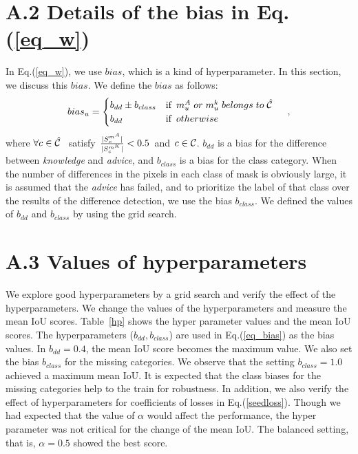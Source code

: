 \documentclass[10pt,twocolumn,letterpaper]{article}
\begin{document}
\section*{A.2 Details of the bias in Eq.(\ref{eq_w})}
In Eq.(\ref{eq_w}), we use $bias$, which is a kind of hyperparameter.
In this section, we discuss this $bias$.
We define the $bias$ as follows:
\footnotesize
\begin{equation}
bias_{u} = 
\begin{cases}
b_{dd} \pm b_{class} & {\rm if}\hspace{1.5mm} m^{A}_{u}\hspace{1.0mm}or\hspace{1.0mm} m^{k}_{u}\hspace{1.0mm}belongs\hspace{1.0mm}to\hspace{1.0mm}\hat{{\cal C}}\hspace{1.0mm}\\
b_{dd} & {\rm if}\hspace{1.5mm}otherwise\\ 
\end{cases}~~~,
\label{eq_bias}
\end{equation}
\normalsize
where $\forall c \in \hat{{\cal C}}\hspace{1.5mm}$ satisfy$\hspace{1.5mm}\frac{|S^{m^{A}}_{c}|}{|S^{m^{K}}_{c}|}<0.5 \hspace{1.5mm}$and$\hspace{1.5mm}c\in {\cal C}$.
$b_{dd}$ is a bias for the difference between {\it knowledge} and {\it advice}, and $ b_{class} $ is a bias for the class category.
When the number of differences in the pixels in each class of mask is obviously large, it is assumed that the {\it advice} has failed, and to prioritize the label of that class over the results of the difference detection, we use the bias $b_{class}$.
We defined the values of $ b_ {dd}$ and $b_{class} $ by using the grid search.


\section*{A.3 Values of hyperparameters}

We explore good hyperparameters by a grid search and verify the effect of the hyperparameters.
We change the values of the hyperparameters and measure the mean IoU scores.
Table~\ref{hp} shows the hyper parameter values and the mean IoU scores.
The hyperparameters ($b_{dd}, b_{class}$) are used in Eq.(\ref{eq_bias}) as the bias values.
In $b_{dd}=0.4$, the mean IoU score becomes the maximum value.
We also set the bias $b_{class}$ for the missing categories.
We observe that the setting $b_{class}=1.0$ achieved a maximum mean IoU.
It is expected that the class biases for the missing categories help to the train for robustness.
In addition, we also verify the effect of hyperparameters for coefficients of losses in Eq.(\ref{seedloss}).
Though we had expected that the value of $\alpha$ would affect the performance, the hyper parameter was not critical for the change of the mean IoU.
The balanced setting, that is, $\alpha=0.5$ showed the best score.
\end{document}
